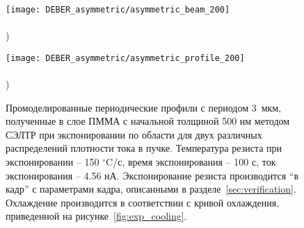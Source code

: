 \begin{figure}[t!]
	\begin{minipage}{0.48\textwidth}
		\texttt{[image: DEBER\_asymmetric/asymmetric\_beam\_200]} \\
		\vspace{-13em} \\ ) \\ \vspace{13em}
	\end{minipage}
	\begin{minipage}{0.48\textwidth}
		\texttt{[image: DEBER\_asymmetric/asymmetric\_profile\_200]} \\
		\vspace{-13em} \\ ) \\ \vspace{13em}
	\end{minipage}
	\vspace{-3em}
	\caption{Промоделированные периодические профили с периодом 3~мкм, полученные в слое ПММА с начальной толщиной 500 нм методом СЭЛТР при экспонировании по области для двух различных распределений плотности тока в пучке. Температура резиста при экспонировании -- 150 $^\circ$C/с, время экспонирования -- 100 с, ток экспонирования -- 4.56 нА. Экспонирование резиста производится ``в кадр'' с параметрами кадра, описанными в разделе~\ref{sec:verification}. Охлаждение производится в соответствии с кривой охлаждения, приведенной на рисунке~\ref{fig:exp_cooling}.}
	\label{fig:DEBER_multibeam}
\end{figure}
